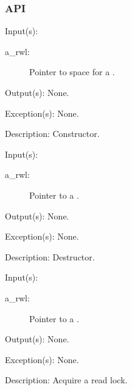 \subsubsection{API}
\begin{capi}
\label{rwl_new}
	\begin{capilist}
	\item[Input(s): ]
		\begin{description}\item[]
		\item[a\_rwl: ]
			Pointer to space for a .
		\end{description}
	\item[Output(s): ] None.
	\item[Exception(s): ] None.
	\item[Description: ]
		Constructor.
	\end{capilist}
\label{rwl_delete}
	\begin{capilist}
	\item[Input(s): ]
		\begin{description}\item[]
		\item[a\_rwl: ]
			Pointer to a \classname{rwl}.
		\end{description}
	\item[Output(s): ] None.
	\item[Exception(s): ] None.
	\item[Description: ]
		Destructor.
	\end{capilist}
\label{rwl_rlock}
	\begin{capilist}
	\item[Input(s): ]
		\begin{description}\item[]
		\item[a\_rwl: ]
			Pointer to a .
		\end{description}
	\item[Output(s): ] None.
	\item[Exception(s): ] None.
	\item[Description: ]
		Acquire a read lock.
	\end{capilist}
\label{rwl_runlock}
	\begin{capilist}

\end{capilist}
\end{capi}

